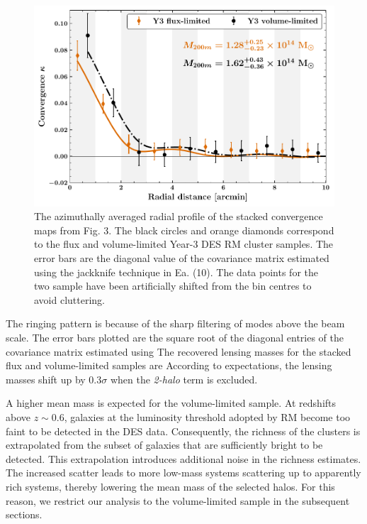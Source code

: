 \begin{figure}
\includegraphics[width=\linewidth]{figs/kappa_model_MF_y3_v6_4_22_full_vl_radprf_JODY.pdf}
\caption{The azimuthally averaged radial profile of the stacked convergence maps from Fig. 3. The black circles and orange diamonds correspond to the flux and volume-limited Year-3 DES RM cluster samples. The error bars are the diagonal value of the covariance matrix estimated using the jackknife technique in Ea. (10). The data points for the two sample have been artificially shifted from the bin centres to avoid cluttering. }
\label{fig:fig_QE_stacked_maps}
\end{figure}

The ringing pattern is because of the sharp filtering of modes above the \sptpol{} beam scale. 
The error bars plotted are the square root of the diagonal entries of the covariance matrix estimated using %
The recovered lensing masses for the stacked flux and volume-limited samples are %
According to expectations, the lensing masses shift up by 0.3$\sigma$ when the {\it 2-halo} term is excluded.


A higher mean mass is expected for the volume-limited sample. 
At redshifts above $z\sim 0.6$, galaxies at the luminosity threshold adopted by RM become too faint to be detected in the DES data. 
Consequently, the richness of the clusters is extrapolated from the subset of galaxies that are sufficiently bright to be detected. 
This extrapolation introduces additional noise in the richness estimates.
The increased scatter leads to more low-mass systems scattering up to apparently rich systems, thereby lowering the mean mass of the selected halos. 
For this reason, we restrict our analysis to the volume-limited sample in the subsequent sections. 
